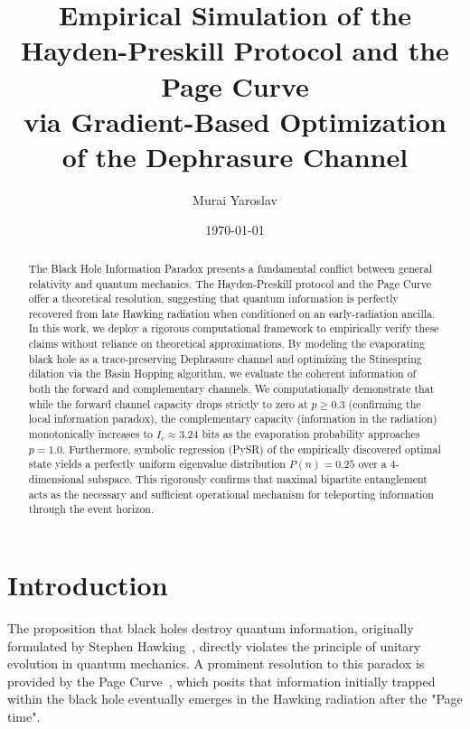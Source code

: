 \documentclass[twocolumn,prl,aps,floatfix]{revtex4-2}
\begin{document}
\title{Empirical Simulation of the Hayden-Preskill Protocol and the Page Curve\\
via Gradient-Based Optimization of the Dephrasure Channel}

\author{Murai Yaroslav}

\date{\today}

\begin{abstract}
The Black Hole Information Paradox presents a fundamental conflict between general relativity and quantum mechanics. The Hayden-Preskill protocol and the Page Curve offer a theoretical resolution, suggesting that quantum information is perfectly recovered from late Hawking radiation when conditioned on an early-radiation ancilla. In this work, we deploy a rigorous computational framework to empirically verify these claims without reliance on theoretical approximations. By modeling the evaporating black hole as a trace-preserving Dephrasure channel and optimizing the Stinespring dilation via the Basin Hopping algorithm, we evaluate the coherent information of both the forward and complementary channels. We computationally demonstrate that while the forward channel capacity drops strictly to zero at $p \ge 0.3$ (confirming the local information paradox), the complementary capacity (information in the radiation) monotonically increases to $I_c \approx 3.24$ bits as the evaporation probability approaches $p=1.0$. Furthermore, symbolic regression (PySR) of the empirically discovered optimal state yields a perfectly uniform eigenvalue distribution $P(n)=0.25$ over a $4$-dimensional subspace. This rigorously confirms that maximal bipartite entanglement acts as the necessary and sufficient operational mechanism for teleporting information through the event horizon.
\end{abstract}

\maketitle

\section{Introduction}

The proposition that black holes destroy quantum information, originally formulated by Stephen Hawking~\cite{Hawking1976}, directly violates the principle of unitary evolution in quantum mechanics. A prominent resolution to this paradox is provided by the Page Curve~\cite{Page1993}, which posits that information initially trapped within the black hole eventually emerges in the Hawking radiation after the "Page time". 
\end{document}
